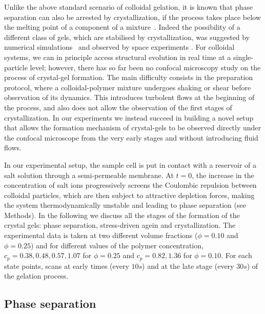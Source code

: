 \documentclass[a4paper,preprint,superscriptaddress]{revtex4}
\begin{document}
Unlike the above standard scenario of colloidal gelation, it is known that phase separation can also be arrested by crystallization, if the process takes place below the melting point of a component of a mixture~\cite{tanaka1985new}. 
Indeed the possibility of a different class of gels, which are stabilised by crystallization, 
was suggested by numerical simulations~\cite{fortini2008crystallization,perez2011pathways} and observed by space experiments \cite{sabin2012}.
For colloidal systems, we can in principle access structural evolution in real time at a single-particle level; however, there has so far been no confocal microscopy  
study on the process of crystal-gel formation. The main difficulty consists in the preparation protocol, where a colloidal-polymer mixture undergoes
shaking or shear before observation of its dynamics. This introduces turbolent flows at the beginning of the process, and also does not allow the
observation of the first stages of crystallization.
In our experiments we instead succeed in building a novel setup that allows the formation mechanism of crystal-gels to be observed directly
under the confocal microscope from the very early stages and without introducing fluid flows.

In our experimental setup, the sample cell is put in contact with a reservoir of a salt solution through a semi-permeable membrane.
At $t=0$, the increase in the concentration of salt ions progressively screens the Coulombic repulsion between colloidal particles,
which are then subject to attractive depletion forces, making the system thermodynamically unstable and leading to phase separation (see Methods).
In the following we discuss all the stages of the formation of the crystal gels: phase separation, stress-driven agein and crystallization.
The experimental data is taken at two different volume fractions ($\phi=0.10$ and $\phi=0.25$) and for different values
of the polymer concentration, $c_p=0.38,0.48,0.57,1.07$ for $\phi=0.25$ and $c_p=0.82,1.36$ for $\phi=0.10$.
For each state points, scans at early times (every $10s$) and at the late stage (every $30s$) of the gelation process.

\subsection*{Phase separation}
\end{document}
